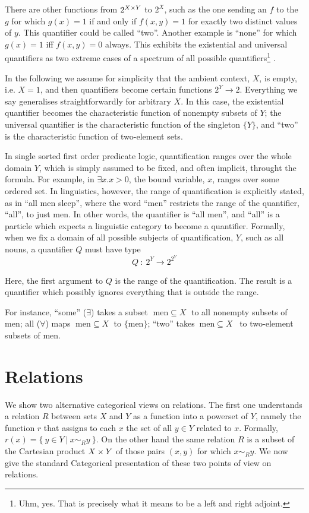 There are other functions from $2^{X\times Y}$ to $2^X$,
such as the one sending an $f$ to the $g$ for which
$g(x) = 1$ if and only if $f(x,y) = 1$ for exactly two distinct values
of $y$. This quantifier could be called ``two''. Another example is
``none'' for which $g(x)=1$ iff $f(x,y) = 0$ always. This exhibits the 
existential and universal quantifiers as two extreme cases of a
spectrum of all possible quantifiers\footnote{Uhm, yes. That is
  precisely what it means to be a left and right adjoint.}  .  

In the following we assume for simplicity that the ambient context,
$X$, is empty, i.e. $X = 1$, and then quantifiers become certain
functions $2^Y \to 2$. Everything we say generalises
straightforwardly for arbitrary $X$.  In this case, the existential quantifier
becomes the characteristic function of nonempty subsets of $Y$; the
universal quantifier is the characteristic function of the singleton
$\{Y\}$, and ``two'' is the characteristic function of two-element sets.

In single sorted first order predicate logic, quantification ranges
over the whole domain $Y$, which is simply assumed to be fixed, and
often implicit, throught the formula. For example, in $\exists x. x >
0$, the bound variable, $x$, ranges over some ordered set. In
linguistics, however, the range of quantification is explicitly
stated, as in ``all men sleep'', where the word ``men'' restricts the
range of the quantifier, ``all'', to just men. In other words, the
quantifier is ``all men'', and ``all'' is a particle which expects a
linguistic category to become a quantifier. Formally, when we fix a
domain of all possible subjects of quantification, $Y$, such as all
nouns, a quantifier $Q$ must have type
\begin{equation}\label{eq:q}
Q ~: ~2^Y \to 2^{2^Y}
\end{equation}

Here, the first argument to $Q$ is the range of the quantification. The
result is a quantifier which possibly ignores everything that is
outside the range.

For instance, ``some'' ($\exists$) takes a subset
$\;\mathrm{men}\subseteq X\;$ to all nonempty subsets of $\mathrm{men}$; all
($\forall$) maps $\;\mathrm{men}\subseteq X\;$ to $ \{ \mathrm{men}
\}$; ``two'' takes $~\mathrm{men} \subseteq X$~ to two-element subsets of
$\mathrm{men}$.

\section{Relations}
We show two alternative categorical views on relations. The first one
understands a relation $R$ between sets $X$ and $Y$ as a function into
a powerset of $Y$, namely the function $r$
that assigns to each $x$ the set of all $y\in  Y$
related to $x$. Formally, $r(x) = \{~y \in Y ~|~ x \sim_R y~\}$. 
On the other hand the same relation $R$ is a subset of the Cartesian
product $X \times Y$ of those pairs $(x,y)$ for which $x \sim_R y$. We now
give the standard Categorical presentation of these two points of view on
relations. 

